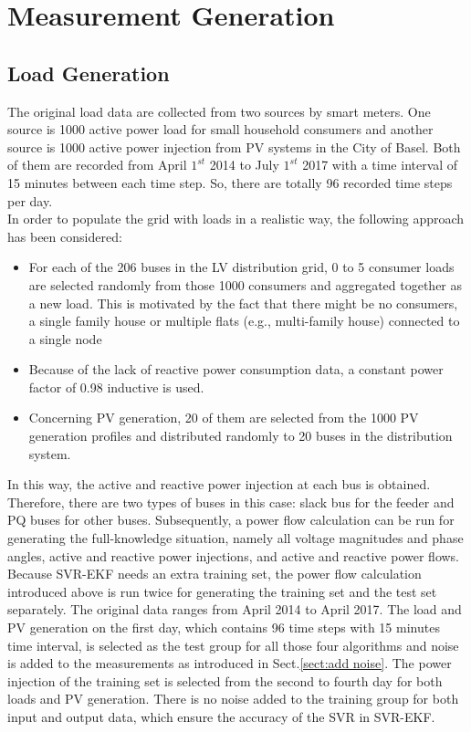 \section{Measurement Generation}
\subsection{Load Generation}
The original load data are collected from two sources by smart meters. One source is 1000 active power load for small household consumers and another source is 1000 active power injection from PV systems in the City of Basel. Both of them are recorded from April $1^{st}$ 2014 to July $1^{st}$ 2017 with a time interval of 15 minutes between each time step. So, there are totally 96 recorded time steps per day.
\bigskip
\\In order to populate the grid with loads in a realistic way, the following approach has been considered:
\begin{itemize}
    \item For each of the 206 buses in the LV distribution grid, 0 to 5 consumer loads are selected randomly from those 1000 consumers and aggregated together as a new load. This is motivated by the fact that there might be no consumers, a single family house or multiple flats (e.g., multi-family house) connected to a single node
    \item Because of the lack of reactive power consumption data, a constant power factor of 0.98 inductive is used.
    \item Concerning PV generation, 20 of them are selected from the 1000 PV generation profiles and distributed randomly to 20 buses in the distribution system.
\end{itemize}
In this way, the active and reactive power injection at each bus is obtained. Therefore, there are two types of buses in this case: slack bus for the feeder and PQ buses for other buses. Subsequently, a power flow calculation can be run for generating the full-knowledge situation, namely all voltage magnitudes and phase angles, active and reactive power injections, and active and reactive power flows. 
\bigskip
\\Because SVR-EKF needs an extra training set, the power flow calculation introduced above is run twice for generating the training set and the test set separately. The original data ranges from April 2014 to April 2017. The load and PV generation on the first day, which contains 96 time steps with 15 minutes time interval, is selected as the test group for all those four algorithms and noise is added to the measurements as introduced in Sect.\ref{sect:add noise}. The power injection of the training set is selected from the second to fourth day for both loads and PV generation. There is no noise added to the training group for both input and output data, which ensure the accuracy of the SVR in SVR-EKF. 
